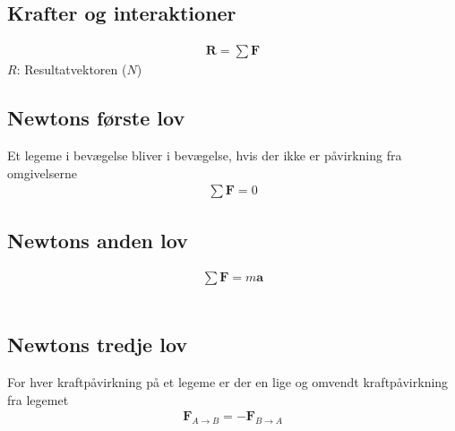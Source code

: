 \subsection{Krafter og interaktioner}
	\begin{align}
		\mathbf{R}=\sum\mathbf{F}
	\end{align}
	$R$: Resultatvektoren ($N$)\\
	\kraft

\subsection{Newtons første lov}
	Et legeme i bevægelse bliver i bevægelse, hvis der ikke er påvirkning fra omgivelserne
	\begin{align}
		\sum\mathbf{F}=0
	\end{align}
	\kraft

\subsection{Newtons anden lov}
	\begin{align}
		\sum\mathbf{F}=m\mathbf{a}
	\end{align}
	\Kraft\\
	\Acc

\subsection{Newtons tredje lov}
	For hver kraftpåvirkning på et legeme er der en lige og omvendt kraftpåvirkning fra legemet
	\begin{align}
		\mathbf{F}_{A\rightarrow B}=-\mathbf{F}_{B\rightarrow A}
	\end{align}
	\Kraft